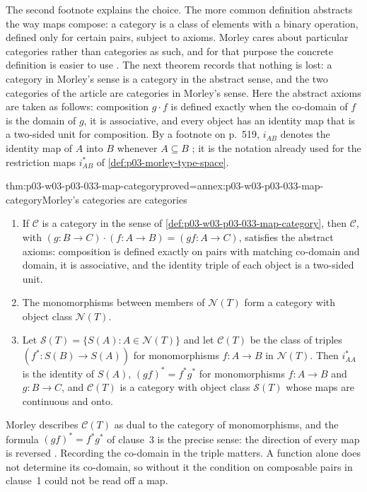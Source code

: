 The second footnote explains the choice. The more common definition
abstracts the way maps compose: a category is a class of elements with a
binary operation, defined only for certain pairs, subject to axioms. Morley
cares about particular categories rather than categories as such, and for
that purpose the concrete definition is easier to use
\cite[p.~518, n.~7]{Morley1965}. The next theorem records that nothing is
lost: a category in Morley's sense is a category in the abstract sense, and
the two categories of the article are categories in Morley's sense. Here
the abstract axioms are taken as follows: composition \(g\cdot f\) is
defined exactly when the co-domain of \(f\) is the domain of \(g\), it is
associative, and every object has an identity map that is a two-sided unit
for composition. By a footnote on p.~519, \(i_{AB}\) denotes the identity
map of \(A\) into \(B\) whenever \(A\subseteq B\)
\cite[p.~519, n.~11]{Morley1965}; it is the notation already used for the
restriction maps \(i_{AB}^*\) of \cref{def:p03-morley-type-space}.

\begin{hbtheorem}{thm:p03-w03-p03-033-map-category}{proved=annex:p03-w03-p03-033-map-category}{Morley's categories are categories}
\begin{enumerate}
\item If \(\mathscr C\) is a category in the sense of
\cref{def:p03-w03-p03-033-map-category}, then \(\mathscr C\), with
\((g:B\to C)\cdot(f:A\to B)=(gf:A\to C)\), satisfies the abstract axioms:
composition is defined exactly on pairs with matching co-domain and
domain, it is associative, and the identity triple of each object is a
two-sided unit.
\item The monomorphisms between members of \(\mathcal N(T)\) form a
category with object class \(\mathcal N(T)\).
\item Let \(\mathscr S(T)=\{S(A):A\in\mathcal N(T)\}\) and let
\(\mathscr C(T)\) be the class of triples \((f^*:S(B)\to S(A))\) for
monomorphisms \(f:A\to B\) in \(\mathcal N(T)\). Then
\(i_{AA}^*\) is the identity of \(S(A)\), \((gf)^*=f^*g^*\) for
monomorphisms \(f:A\to B\) and \(g:B\to C\), and \(\mathscr C(T)\) is a
category with object class \(\mathscr S(T)\) whose maps are continuous
and onto.
\end{enumerate}
\end{hbtheorem}

Morley describes \(\mathscr C(T)\) as dual to the category of
monomorphisms, and the formula \((gf)^*=f^*g^*\) of clause~3 is the
precise sense: the direction of every map is reversed
\cite[p.~519]{Morley1965}. Recording the co-domain in the triple matters.
A function alone does not determine its co-domain, so without it the
condition on composable pairs in clause~1 could not be read off a map.

